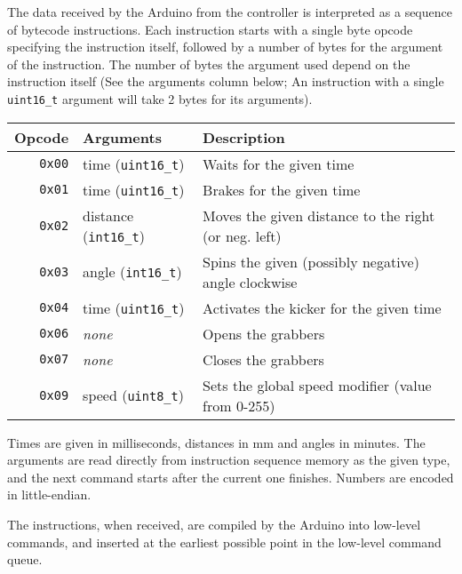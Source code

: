 The data received by the Arduino from the controller is interpreted as a sequence of bytecode instructions. Each instruction starts with a single byte opcode specifying the instruction itself, followed by a number of bytes for the argument of the instruction. The number of bytes the argument used depend on the instruction itself (See the arguments column below; An instruction with a single \verb$uint16_t$ argument will take 2 bytes for its arguments).

\begin{table}[H]

\begin{tabularx}{\textwidth}{rlX}
    Opcode & Arguments & Description \\
    \hline
    \texttt{0x00} & time (\texttt{uint16\_t}) &
        Waits for the given time \\
    \texttt{0x01} & time (\texttt{uint16\_t}) &
        Brakes for the given time \\
    \texttt{0x02} & distance (\texttt{int16\_t}) &
        Moves the given distance to the right (or neg. left) \\
    \texttt{0x03} & angle (\texttt{int16\_t}) &
        Spins the given (possibly negative) angle clockwise \\
    \texttt{0x04} & time (\texttt{uint16\_t}) &
        Activates the kicker for the given time \\
    \texttt{0x06} & \textit{none} &
        Opens the grabbers \\
    \texttt{0x07} & \textit{none} &
        Closes the grabbers \\
    \texttt{0x09} & speed (\texttt{uint8\_t}) &
        Sets the global speed modifier (value from 0-255) \\
\end{tabularx}
\end{table}

Times are given in milliseconds, distances in mm and angles in minutes.  The arguments are read directly from instruction sequence memory as the given type, and the next command starts after the current one finishes. Numbers are encoded in little-endian.

The instructions, when received, are compiled by the Arduino into low-level commands, and inserted at the earliest possible point in the low-level command queue.

